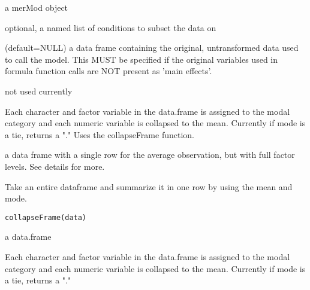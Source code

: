 \documentclass[letterpaper]{book}
\begin{document}
%
\begin{Arguments}
\begin{ldescription}
\item[\code{merMod}] a merMod object

\item[\code{varList}] optional, a named list of conditions to subset the data on

\item[\code{origData}] (default=NULL) a data frame containing the original,
untransformed data used to call the model. This MUST be specified if
the original variables used in formula function calls are NOT present
as 'main effects'.

\item[\code{...}] not used currently
\end{ldescription}
\end{Arguments}
%
\begin{Details}\relax
Each character and factor variable in the data.frame is assigned to the
modal category and each numeric variable is collapsed to the mean. Currently if
mode is a tie, returns a "." Uses the collapseFrame function.
\end{Details}
%
\begin{Value}
a data frame with a single row for the average observation, but with full
factor levels. See details for more.
\end{Value}
%
\begin{Description}\relax
Take an entire dataframe and summarize it in one row by using the
mean and mode.
\end{Description}
%
\begin{Usage}
\begin{verbatim}
collapseFrame(data)
\end{verbatim}
\end{Usage}
%
\begin{Arguments}
\begin{ldescription}
\item[\code{data}] a data.frame
\end{ldescription}
\end{Arguments}
%
\begin{Details}\relax
Each character and factor variable in the data.frame is assigned to the
modal category and each numeric variable is collapsed to the mean. Currently if
mode is a tie, returns a "."
\end{Details}
\end{document}
